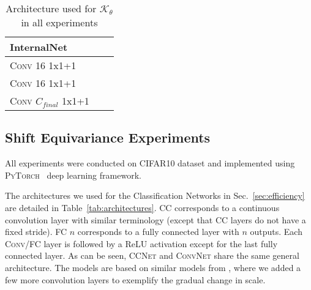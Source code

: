 \begin{appendices}
\begin{table}[h!]
    \centering
    \begin{tabular}{lll}
    \toprule
       InternalNet  \\
    \midrule
      \textsc{Conv} 16 1x1+1  \\
      \textsc{Conv} 16 1x1+1  \\
      \textsc{Conv} $C_{final}$ 1x1+1  \\
    \bottomrule
    \end{tabular}
    \vspace{5pt}
    \caption{Architecture used for $\mathcal{K}_\theta$ in all experiments}
    \label{tab:internal}
\end{table}


\subsection{Shift Equivariance Experiments}
All experiments were conducted on \textsc{CIFAR10} dataset \cite{CIFAR10} and implemented using \textsc{PyTorch}~\cite{paszke2017automatic} deep learning framework. 

The architectures we used for the Classification Networks in Sec.~\ref{sec:efficiency} are detailed in Table~\ref{tab:architectures}. \textsc{CC} corresponds to a continuous convolution layer with similar terminology (except that \textsc{CC} layers do not have a fixed stride). \textsc{FC} $n$ corresponds to a fully connected layer with $n$ outputs. Each \textsc{Conv}/\textsc{FC} layer is followed by a ReLU activation except for the last fully connected layer. As can be seen, \textsc{CCNet} and \textsc{ConvNet} share the same general architecture. The models are based on similar models from \cite{wong2018scaling,atzmon2019controlling}, where we added a few more convolution layers to exemplify the gradual change in scale.


\end{appendices}
